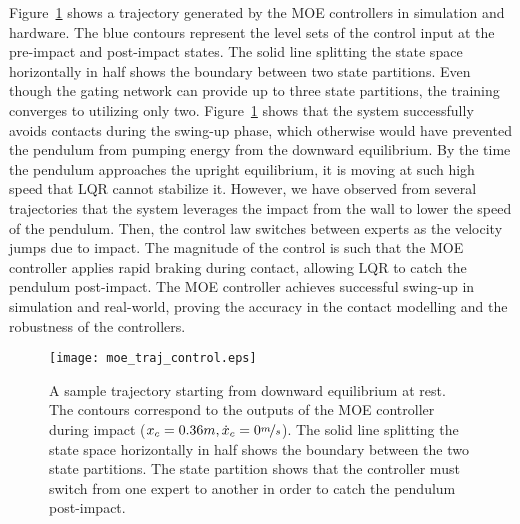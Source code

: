Figure~\ref{fig:cartpole_trajectory} shows a trajectory generated by the MOE
controllers in simulation and hardware.
%
The blue contours represent the level sets of the control input at the
pre-impact and post-impact states.
%
The solid line splitting the state space horizontally in half shows the boundary
between two state partitions.
%
Even though the gating network can provide up to three state partitions, the
training converges to utilizing only two.
%
Figure~\ref{fig:cartpole_trajectory} shows that the system successfully avoids
contacts during the swing-up phase, which otherwise would have prevented the
pendulum from pumping energy from the downward equilibrium.
%
By the time the pendulum approaches the upright equilibrium, it is moving at
such high speed that LQR cannot stabilize it.
%
However, we have observed from several trajectories that the system leverages
the impact from the wall to lower the speed of the pendulum.
%
Then, the control law switches between experts as the velocity jumps due to impact.
%
The magnitude of the control is such that the MOE controller applies rapid
braking during contact, allowing LQR to catch the pendulum post-impact.
%
The MOE controller achieves successful swing-up in simulation and real-world,
proving the accuracy in the contact modelling and the robustness of the
controllers.
\begin{figure}[H]
    \centering
    \texttt{[image: moe\_traj\_control.eps]}
    \caption{A sample trajectory starting from downward equilibrium at rest.
    The contours correspond to the outputs of the MOE controller during impact
    ($x_c=0.36m, \dot{x}_c = 0\nicefrac{m}{s}$). The solid line
    splitting the state space horizontally in half shows the boundary between
    the two state partitions. The state partition shows that the controller must
    switch from one expert to another in order to catch the pendulum
    post-impact.}
    \label{fig:cartpole_trajectory}
\end{figure}

